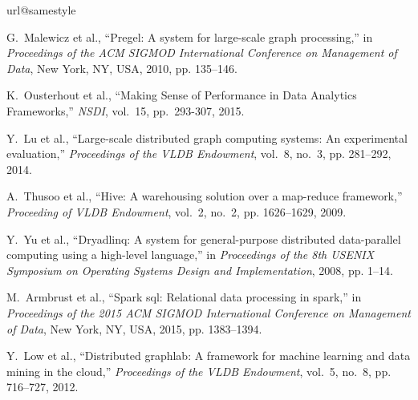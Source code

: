 \documentclass[10pt,journal,compsoc]{IEEEtran}
\begin{document}
\begin{thebibliography}{43}
\providecommand{\url}[1]{#1}
\csname url@samestyle\endcsname
\providecommand{\newblock}{\relax}
\providecommand{\bibinfo}[2]{#2}
\providecommand{\BIBentrySTDinterwordspacing}{\spaceskip=0pt\relax}
\providecommand{\BIBentryALTinterwordstretchfactor}{4}
\providecommand{\BIBentryALTinterwordspacing}{\spaceskip=\fontdimen2\font plus
\BIBentryALTinterwordstretchfactor\fontdimen3\font minus
  \fontdimen4\font\relax}
\providecommand{\BIBforeignlanguage}[2]{{%
\expandafter\ifx\csname l@#1\endcsname\relax
\typeout{** WARNING: IEEEtran.bst: No hyphenation pattern has been}%
\typeout{** loaded for the language `#1'. Using the pattern for}%
\typeout{** the default language instead.}%
\else
\language=\csname l@#1\endcsname
\fi
#2}}
\providecommand{\BIBdecl}{\relax}
\BIBdecl

G.~Malewicz et al., ``Pregel: A system for large-scale graph processing,'' in
  \emph{Proceedings of the ACM SIGMOD International Conference on Management of
  Data}, New York, NY, USA, 2010, pp. 135--146.

K.~Ousterhout et al., ``Making Sense of Performance in Data Analytics Frameworks,'' \emph{NSDI}, vol.~15, pp.~293-307, 2015.

Y.~Lu et al., ``Large-scale distributed graph computing
  systems: An experimental evaluation,'' \emph{Proceedings of the VLDB
  Endowment}, vol.~8, no.~3, pp. 281--292, 2014.

A.~Thusoo et al., ``Hive: A warehousing solution over a map-reduce
  framework,'' \emph{Proceeding of VLDB Endowment}, vol.~2, no.~2, pp.
  1626--1629, 2009.

Y.~Yu et al., ``Dryadlinq: A system for general-purpose distributed
  data-parallel computing using a high-level language,'' in \emph{Proceedings
  of the 8th USENIX Symposium on Operating Systems Design and Implementation},
  2008, pp. 1--14.

M.~Armbrust et al., ``Spark sql: Relational
  data processing in spark,'' in \emph{Proceedings of the 2015 ACM SIGMOD
  International Conference on Management of Data}, New York, NY, USA, 2015, pp. 1383--1394.

Y.~Low et al.,
  ``Distributed graphlab: A framework for machine learning and data mining in
  the cloud,'' \emph{Proceedings of the VLDB Endowment}, vol.~5, no.~8, pp.
  716--727, 2012.


\end{thebibliography}
\end{document}
